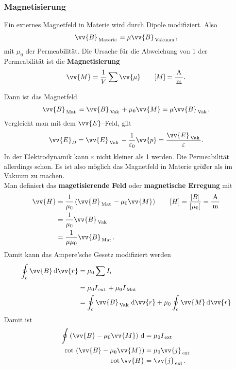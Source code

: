 \documentclass[a4paper,12pt]{article}
\newcommand{\td}{\,\text{d}}
\begin{document}
\subsubsection{Magnetisierung}
Ein externes Magnetfeld in Materie wird durch Dipole modifiziert. Also
\begin{align*} 
        \vv{B}_{\,\text{Materie}\,}=\mu \vv{B}_{\,\text{Vakuum}\,}
,\end{align*} 
mit $\mu _0$ der Permeabilität. Die Ursache für die Abweichung von 1 der Permeabilität ist die \textbf{Magnetisierung}
\begin{align*} 
        \vv{M}=\dfrac{1}{V}\sum_{}^{}\vv{\mu }\qquad [M]=\dfrac{\,\text{A}\,}{\,\text{m}\,}
.\end{align*} 
Dann ist das Magnetfeld
\begin{align*} 
        \vv{B}_{\,\text{Mat}\,}=\vv{B}_{\,\text{Vak}\,}+\mu _0\vv{M}=\mu \vv{B}_{\,\text{Vak}\,}
.\end{align*} 
Vergleicht man mit dem $\vv{E}$--Feld, gilt
\begin{align*} 
        \vv{E}_D=\vv{E}_{\,\text{Vak}\,}-\dfrac{1}{\varepsilon _0}\vv{p}=\dfrac{\vv{E}_{\,\text{Vak}\,}}{\varepsilon }
.\end{align*} 
In der Elektrodynamik kann $\varepsilon $ nicht kleiner als 1 werden. Die Permeabilität allerdings schon. Es ist also möglich das Magnetfeld in Materie größer als im Vakuum zu machen.\\\indent
Man definiert das \textbf{magetisierende Feld} oder \textbf{magnetische Erregung} mit
\begin{align*} 
        \vv{H}&=\dfrac{1}{\mu _0}\left(\vv{B}_{\,\text{Mat}\,}-\mu _0\vv{M}\right)\qquad [H]=\dfrac{[B]}{[\mu _0]}=\dfrac{\,\text{A}\,}{\,\text{m}\,}\\
              &=\dfrac{1}{\mu _0}\vv{B}_{\,\text{Vak}\,}\\
              &=\dfrac{1}{\mu \mu _0}\vv{B}_{\,\text{Mat}\,}
.\end{align*} 
Damit kann das Ampere'sche Gesetz modifiziert werden
\begin{align*} 
        \oint_{c}^{}\vv{B}\td \vv{r}&=\mu _0\sum_{}^{}I_i\\
                                    &=\mu _0I_{\,\text{ext}\,}+\mu _0I_{\,\text{Mat}\,}\\
                                    &=\oint_{c}^{}\vv{B}_{\,\text{Vak}\,}\td \vv{r}+\mu _0\oint_{c}^{}\vv{M}\td \vv{r}
\end{align*} 
Damit ist
\begin{align*} 
        \oint_{}^{}\left(\vv{B}-\mu _0\vv{M}\right)\td &=\mu _0I_{\,\text{ext}\,}\\
        \,\text{rot}\,\left(\vv{B}-\mu _0\vv{M}\right)&=\mu _0\vv{j}_{\,\text{ext}\,}\\
        \,\text{rot}\,\vv{H}&=\vv{j}_{\,\text{ext}\,}
.\end{align*} 
\end{document}
